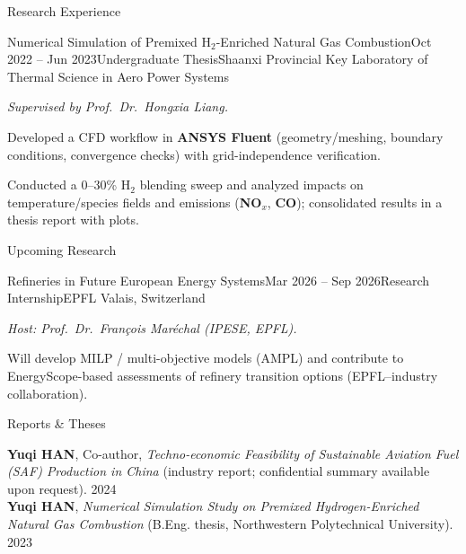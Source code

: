 \documentclass{resume}
\begin{document}
\begin{rSection}{Research Experience}
\begin{rSubsection}{Numerical Simulation of Premixed H$_2$-Enriched Natural Gas Combustion}{Oct 2022 -- Jun 2023}{Undergraduate Thesis}{Shaanxi Provincial Key Laboratory of Thermal Science in Aero Power Systems}
\item[] \textit{Supervised by Prof.\ Dr.\ Hongxia Liang.}
\item Developed a CFD workflow in \textbf{ANSYS Fluent} (geometry/meshing, boundary conditions, convergence checks) with grid-independence verification.
\item Conducted a 0--30\% H$_2$ blending sweep and analyzed impacts on temperature/species fields and emissions (\textbf{NO$_x$}, \textbf{CO}); consolidated results in a thesis report with plots.
\end{rSubsection}

\end{rSection}

\begin{rSection}{Upcoming Research}

\begin{rSubsection}{Refineries in Future European Energy Systems}{Mar 2026 -- Sep 2026}{Research Internship}{EPFL Valais, Switzerland}
\item[] \textit{Host: Prof.\ Dr.\ Fran\c{c}ois Mar\'echal (IPESE, EPFL).}
\item Will develop MILP / multi-objective models (AMPL) and contribute to EnergyScope-based assessments of refinery transition options (EPFL--industry collaboration).
\end{rSubsection}

\end{rSection}

\begin{rSection}{Reports \& Theses} \itemsep -3pt

\textbf{Yuqi HAN}, Co-author, \textit{Techno-economic Feasibility of Sustainable Aviation Fuel (SAF) Production in China} (industry report; confidential summary available upon request). \hfill 2024\\
\textbf{Yuqi HAN}, \textit{Numerical Simulation Study on Premixed Hydrogen-Enriched Natural Gas Combustion} (B.Eng. thesis, Northwestern Polytechnical University). \hfill 2023\\

\end{rSection}
\end{document}
